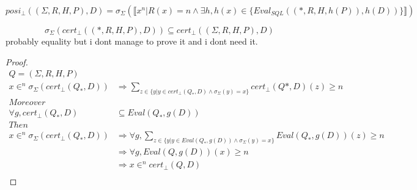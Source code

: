 \begin{mydef}
	$$ posi_\bot((\Sigma,R,H,P),D) =  \sigma_{\Sigma}(\llbracket x^n| R(x) = n \land \exists h, h(x) \in \{Eval_{SQL}((*,R,H,h(P)),h(D))\} \rrbracket) $$
\end{mydef}

\begin{myprop}
	$$\sigma_\Sigma(cert_{\bot}((*,R,H,P),D)) \subseteq cert_{\bot}((\Sigma,R,H,P),D)$$ 
	probably equality but i dont manage to prove it and i dont need it.
\end{myprop}
\begin{proof}
	\begin{align*}
		Q = (\Sigma,R,H,P) \\
		x \in^n \sigma_\Sigma(cert_{\bot}(Q_*,D)) & \Rightarrow \sum_{z \in \{y | y \in cert_{\bot}(Q_*,D) \land \sigma_\Sigma(y) = x \} }{cert_{\bot}(Q*,D)(z)} \geq n \\
		Moreover \\
		\forall g, cert_\bot(Q_*,D) &  \subseteq Eval(Q_*,g(D)) \\
		Then \\
		x \in^n \sigma_\Sigma(cert_{\bot}(Q_*,D)) & \Rightarrow \forall g , \sum_{z \in \{y | y \in Eval(Q_*,g(D)) \land \sigma_\Sigma(y) = x \} }{Eval(Q_*,g(D)) (z)} \geq n \\
		& \Rightarrow \forall g, Eval(Q,g(D))(x) \geq n \\
		& \Rightarrow x \in^n cert_\bot(Q,D) \\
	\end{align*}
\end{proof}	

